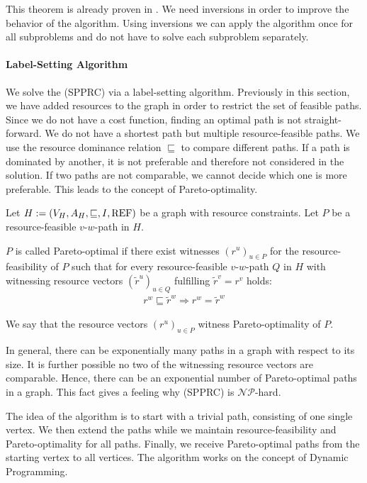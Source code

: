 This theorem is already proven in \cite[p.~83]{Kaiser}. We need inversions in order to improve the behavior of the algorithm. Using inversions we can apply the algorithm once for all subproblems and do not have to solve each subproblem separately.

\paragraph{Label-Setting Algorithm} \parfill

We solve the (SPPRC) via a label-setting algorithm. Previously in this section, we have added resources to the graph in order to restrict the set of feasible paths. Since we do not have a cost function, finding an optimal path is not straight-forward. We do not have a shortest path but multiple resource-feasible paths. We use the resource dominance relation $\sqsubseteq$ to compare different paths. If a path is dominated by another, it is not preferable and therefore not considered in the solution. If two paths are not comparable, we cannot decide which one is more preferable. This leads to the concept of Pareto-optimality.

\begin{definition}

Let ${H:=\left(V_H,A_H,\sqsubseteq,I,\operatorname{REF}\right)}$ be a graph with resource constraints. Let $P$ be a resource-feasible $v$-$w$-path in $H$.

$P$ is called Pareto-optimal if there exist witnesses $\left(r^u\right)_{u\in P}$ for the resource-feasibility of $P$ such that for every resource-feasible $v$-$w$-path $Q$ in $H$ with witnessing resource vectors $\left(\tilde{r}^u\right)_{u\in Q}$ fulfilling ${\tilde{r}^v = r^v}$ holds:
\begin{align*}
	r^w\sqsubseteq \tilde{r}^w \Rightarrow r^w = \tilde{r}^w
\end{align*}

We say that the resource vectors $\left(r^u\right)_{u\in P}$ witness Pareto-optimality of $P$.

\end{definition}

In general, there can be exponentially many paths in a graph with respect to its size. It is further possible no two of the witnessing resource vectors are comparable. Hence, there can be an exponential number of Pareto-optimal paths in a graph. This fact gives a feeling why (SPPRC) is $\mathcal{NP}$-hard.

The idea of the algorithm is to start with a trivial path, consisting of one single vertex. We then extend the paths while we maintain resource-feasibility and Pareto-optimality for all paths. Finally, we receive Pareto-optimal paths from the starting vertex to all vertices. The algorithm works on the concept of Dynamic Programming.


